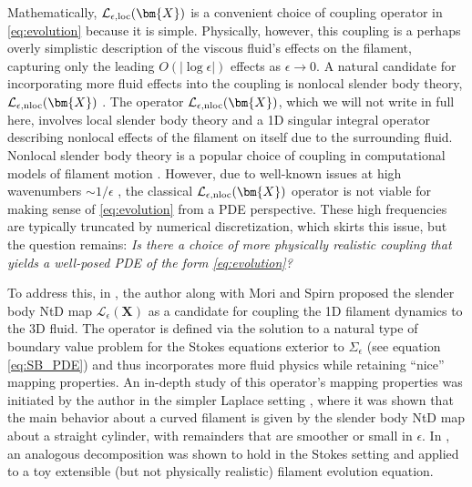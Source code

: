 \documentclass[11pt,reqno]{amsart}
\newcommand{\X}{\bm{X}}
\newcommand{\abs}[1]{\left\lvert #1 \right\rvert}
\newcommand{\mc}[1]{\mathcal{#1}}
\theoremstyle{definition}
\begin{document}
Mathematically, $\mc{L}_{\epsilon,\rm loc}(\X)$ is a convenient choice of coupling operator in \eqref{eq:evolution} because it is simple. Physically, however, this coupling is a perhaps overly simplistic description of the viscous fluid's effects on the filament, capturing only the leading $O(\abs{\log\epsilon})$ effects as $\epsilon\to 0$. A natural candidate for incorporating more fluid effects into the coupling is nonlocal slender body theory, $\mc{L}_{\epsilon,\rm nloc}(\X)$ \cite{keller1976slender,johnson1980improved, tornberg2004simulating}. The operator $\mc{L}_{\epsilon,\rm nloc}(\X)$, which we will not write in full here, involves local slender body theory and a 1D singular integral operator describing nonlocal effects of the filament on itself due to the surrounding fluid. Nonlocal slender body theory is a popular choice of coupling in computational models of filament motion \cite{li2013sedimentation,spagnolie2011comparative,tornberg2006numerical,lauga2009hydrodynamics,cortez2012slender,NorwayPoF,maxian2021integral,maxian2022hydrodynamics}. However, due to well-known issues at high wavenumbers $\sim1/\epsilon$ \cite{gotz2000interactions, inverse, tornberg2004simulating, shelley2000stokesian}, the classical $\mc{L}_{\epsilon,\rm nloc}(\X)$ operator is not viable for making sense of \eqref{eq:evolution} from a PDE perspective. These high frequencies are typically truncated by numerical discretization, which skirts this issue, but the question remains: \emph{Is there a choice of more physically realistic coupling that yields a well-posed PDE of the form \eqref{eq:evolution}?}


To address this, in \cite{closed_loop,free_ends}, the author along with Mori and Spirn proposed the slender body NtD map $\mc{L}_\epsilon(\X)$ as a candidate for coupling the 1D filament dynamics to the 3D fluid. The operator is defined via the solution to a natural type of boundary value problem for the Stokes equations exterior to $\Sigma_\epsilon$ (see equation \eqref{eq:SB_PDE}) and thus incorporates more fluid physics while retaining ``nice'' mapping properties. An in-depth study of this operator's mapping properties was initiated by the author in the simpler Laplace setting \cite{ohm2025angle}, where it was shown that the main behavior about a curved filament is given by the slender body NtD map about a straight cylinder, with remainders that are smoother or small in $\epsilon$. In \cite{ohm2024free}, an analogous decomposition was shown to hold in the Stokes setting and applied to a toy extensible (but not physically realistic) filament evolution equation. 
\end{document}
